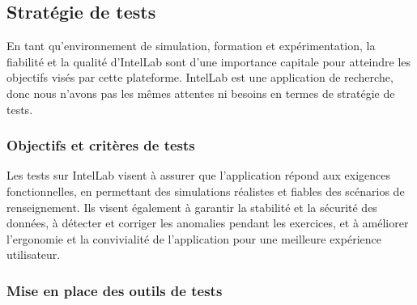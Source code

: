 \subsection{Stratégie de tests}

En tant qu'environnement de simulation, formation et expérimentation, la fiabilité et la qualité d’IntelLab sont d'une importance capitale pour atteindre les objectifs visés par cette plateforme.
IntelLab est une application de recherche, donc nous n’avons pas les mêmes attentes ni besoins en termes de stratégie de tests.


\subsubsection{Objectifs et critères de tests}
Les tests sur IntelLab visent à assurer que l'application répond aux exigences fonctionnelles, en permettant des simulations réalistes et fiables des scénarios de renseignement.
Ils visent également à garantir la stabilité et la sécurité des données, à détecter et corriger les anomalies pendant les exercices, et à améliorer l'ergonomie et la convivialité de l'application pour une meilleure expérience utilisateur.


\subsubsection{Mise en place des outils de tests}


